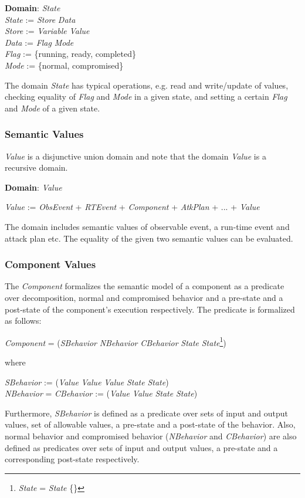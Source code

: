 \documentclass[conference]{IEEEtran}
\begin{document}
\noindent\textbf{Domain}: \emph{State}\\
\emph{State} := \emph{Store}  \emph{Data}\\
\emph{Store} := \emph{Variable}  \emph{Value}\\
\emph{Data} := \emph{Flag}  \emph{Mode}\\
\emph{Flag} := \{running, ready, completed\}\\
\emph{Mode} := \{normal, compromised\}


The domain \emph{State} has typical operations, e.g. read and write/update of values, checking equality of \emph{Flag} and \emph{Mode} in a given state, and setting a certain \emph{Flag} and \emph{Mode} of a given state. 

\subsubsection*{Semantic Values}
\emph{Value} is a disjunctive union domain and note that the domain \emph{Value} is a recursive domain.

\noindent\textbf{Domain}: \emph{Value}
\begin{tabbing}
\emph{Value} := \emph{ObsEvent} + \emph{RTEvent} + \emph{Component} + \emph{AtkPlan} + ... + \emph{Value}
\end{tabbing}
The domain includes semantic values of observable event, a run-time event and attack plan etc.
The equality of the given two semantic values can be evaluated.
\subsubsection*{Component Values}
The \emph{Component} formalizes the semantic model of a component as a predicate over decomposition, normal and compromised behavior and a pre-state and a post-state of the component's execution respectively. The predicate is formalized as follows:
\begin{center}
\emph{Component} = (\emph{SBehavior}  \emph{NBehavior}  \emph{CBehavior}  \emph{State}  \emph{State}\footnote[3]{\emph{State} = \emph{State}  \{\}})
\end{center}
where
\begin{tabbing}
\emph{SBehavior} := (\emph{Value}  \emph{Value}  \emph{Value}  \emph{State}  \emph{State})\\
\emph{NBehavior} = \emph{CBehavior} := (\emph{Value}  \emph{Value}  \emph{State}  \emph{State})
\end{tabbing}
Furthermore, \emph{SBehavior} is defined as a predicate over sets of input and output values, set of allowable values, a pre-state and a post-state of the behavior. Also, normal behavior and compromised behavior (\emph{NBehavior} and \emph{CBehavior}) are also defined as predicates over sets of input and output values, a pre-state and a corresponding post-state respectively. 
\end{document}
